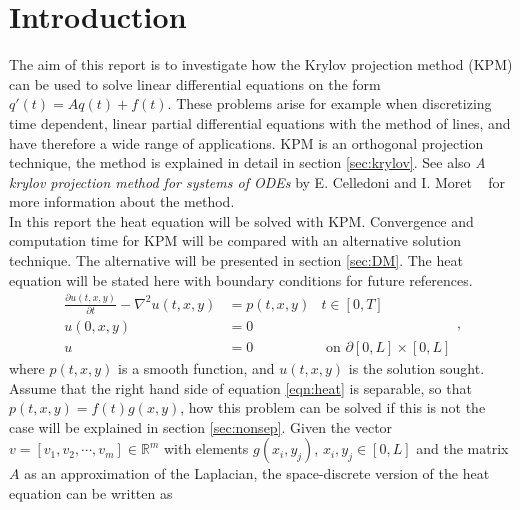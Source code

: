 \chapter{Introduction}%

The aim of this report is to investigate how the Krylov projection method (KPM)  can be used to solve linear differential equations on the form $q'(t)=Aq(t)+f(t)$. These problems arise for example when discretizing time dependent, linear partial differential equations with the method of lines, and have therefore a wide range of applications. 
KPM is an orthogonal projection technique, the method is explained in detail in section \ref{sec:krylov}. See also \textit{A krylov projection method for systems of ODEs} by E. Celledoni and I. Moret ~\cite{elena} for more information about the method. \\


In this report the heat equation will be solved with KPM. Convergence and computation time for KPM will be compared with an alternative solution technique. The alternative will be presented in section \ref{sec:DM}.
The heat equation will be stated here with boundary conditions for future references. \\
\begin{equation} \label{eqn:heat}
\begin{aligned}
\frac{\partial u(t,x,y)}{\partial t} - \nabla^2 u(t,x,y) &= p(t,x,y) & t \in [0,T]\\
u(0,x,y) &= 0 \\
u & = 0 			&\text{ on } \partial [0,L] \times [0,L]
\end{aligned},
\end{equation}
where $p(t,x,y)$ is a smooth function, and $u(t,x,y)$ is the solution sought.\\

Assume that the right hand side of equation \eqref{eqn:heat} is separable, so that $p(t,x,y) = f(t)g(x,y) $, how this problem can be solved if this is not the case will be explained in section \ref{sec:nonsep}.
Given the vector $v = [v_1,v_2, \cdots, v_m] \in \mathbb{R}^m $ with elements $ g(x_i,y_j)$, $x_i,y_j \in [0,L]$ and the matrix $A$ as an approximation of the Laplacian, the space-discrete version of the heat equation can be written as

